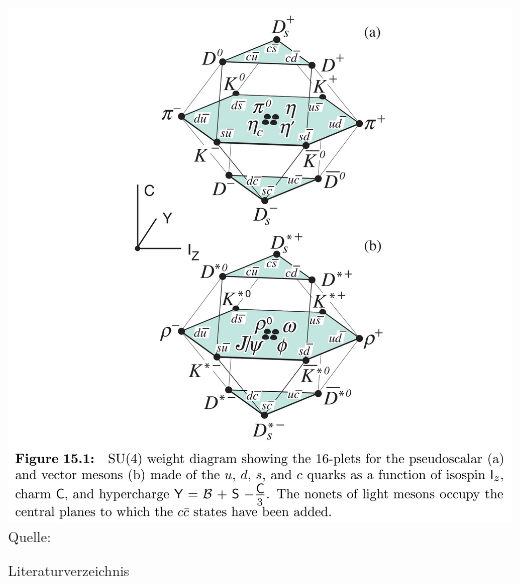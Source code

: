 \documentclass[aspectratio=169]{beamer} %
\newcommand{\figcite}[1]{\\[-3mm]{\tiny Quelle: \cite{#1}}}
\begin{document}
\begin{frame}
    \pagebreak
      \includegraphics[height=0.9\textheight, width=\linewidth, keepaspectratio]{Images/90f0590a-0e4a-4d62-bd40-0bcce4be9feb.jpg}%
      \figcite{C.Amsler.2017}
    
    \end{frame}


    
    \begin{frame}{Literaturverzeichnis}
   \printbibliography%
    \end{frame}
\end{document}
